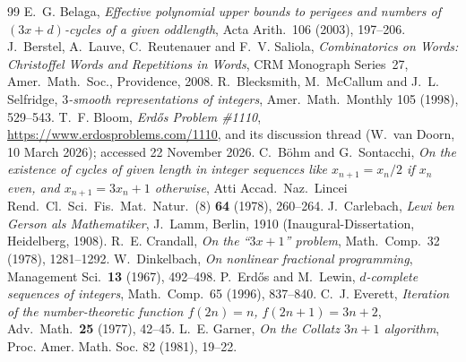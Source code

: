 \documentclass[10pt,a4paper,titlepage]{article}
\begin{document}
\begin{thebibliography}{99}
 E.~G. Belaga, \emph{Effective polynomial upper bounds to perigees and
numbers of $(3x+d)$-cycles of a given oddlength}, Acta Arith.\ 106 (2003), 197--206.
 J.~Berstel, A.~Lauve, C.~Reutenauer and F.~V. Saliola,
  \emph{Combinatorics on Words: Christoffel Words and Repetitions in Words}, CRM Monograph
  Series~27, Amer.\ Math.\ Soc., Providence, 2008.
 R.~Blecksmith, M.~McCallum and J.~L. Selfridge, \emph{$3$-smooth
representations of integers}, Amer.\ Math.\ Monthly 105 (1998), 529--543.
 T.~F. Bloom, \emph{Erd\H{o}s Problem \#1110}, \url{https://www.erdosproblems.com/1110},
  and its discussion thread (W.~van Doorn, 10 March 2026); accessed 22 November 2026.
 C.~B\"ohm and G.~Sontacchi, \emph{On the existence of cycles of given
  length in integer sequences like $x_{n+1} = x_n/2$ if $x_n$ even, and $x_{n+1} = 3x_n + 1$
  otherwise}, Atti Accad.\ Naz.\ Lincei Rend.\ Cl.\ Sci.\ Fis.\ Mat.\ Natur.\ (8) \textbf{64} (1978),
  260--264.
 J.~Carlebach, \emph{Lewi ben Gerson als Mathematiker}, J.~Lamm, Berlin,
1910 (Inaugural-Dissertation, Heidelberg, 1908).
 R.~E. Crandall, \emph{On the ``$3x + 1$'' problem}, Math.\ Comp.\ 32 (1978),
  1281--1292.
 W.~Dinkelbach, \emph{On nonlinear fractional programming}, Management Sci.\
  \textbf{13} (1967), 492--498.
 P.~Erd\H{o}s and M.~Lewin, \emph{$d$-complete sequences of integers},
  Math.\ Comp.\ 65 (1996), 837--840.
 C.~J. Everett, \emph{Iteration of the number-theoretic function
  $f(2n) = n$, $f(2n+1) = 3n+2$}, Adv.\ Math.\ \textbf{25} (1977), 42--45.
\bibitem{Garner1981} L.~E. Garner, \emph{On the Collatz $3n + 1$ algorithm}, Proc. Amer.
  Math. Soc. 82 (1981), 19--22.


\end{thebibliography}
\end{document}
